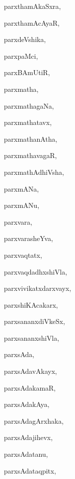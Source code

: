 \begin{multicols}{3}
{\noindent
{parxthamAkaSxra}, \pageref{parxthamAkaSxra}

\noindent
{parxthamAcAyaR}, \pageref{parxthamAcAyaR}

\noindent
{parxdeVshika}, \pageref{parxdeVshika}

\noindent
{parxpaMci}, \pageref{parxpaMci}

\noindent
{parxBAmUtiR}, \pageref{parxBAmUtiR}

\noindent
{parxmatha}, \pageref{parxmatha}

\noindent
{parxmathagaNa}, \pageref{parxmathagaNa}

\noindent
{parxmathatavx}, \pageref{parxmathatavx}

\noindent
{parxmathanAtha}, \pageref{parxmathanAtha}

\noindent
{parxmathavagaR}, \pageref{parxmathavagaR}

\noindent
{parxmathAdhiVsha}, \pageref{parxmathAdhiVsha}

\noindent
{parxmANa}, \pageref{parxmANa}

\noindent
{parxmANu}, \pageref{parxmANu}

\noindent
{parxvara}, \pageref{parxvara}

\noindent
{parxvarasheYva}, \pageref{parxvarasheYva}

\noindent
{parxvaqtatx}, \pageref{parxvaqtatx}

\noindent
{parxvaqdadhxshiVla}, \pageref{parxvaqdadhxshiVla}

\noindent
{parxvivikatxdarxvayx}, \pageref{parxvivikatxdarxvayx}

\noindent
{parxshiKAcakarx}, \pageref{parxshiKAcakarx}

\noindent
{parxsananxdiVkeSx}, \pageref{parxsananxdiVkeSx}

\noindent
{parxsananxshiVla}, \pageref{parxsananxshiVla}

\noindent
{parxsAda}, \pageref{parxsAda}

\noindent
{parxsAdavAkayx}, \pageref{parxsAdavAkayx}

\noindent
{parxsAdakamaR}, \pageref{parxsAdakamaR}

\noindent
{parxsAdakAya}, \pageref{parxsAdakAya}

\noindent
{parxsAdagArxhaka}, \pageref{parxsAdagArxhaka}

\noindent
{parxsAdajihevx}, \pageref{parxsAdajihevx}

\noindent
{parxsAdatanu}, \pageref{parxsAdatanu}

\noindent
{parxsAdataqpitx}, \pageref{parxsAdataqpitx}

}
\end{multicols}
